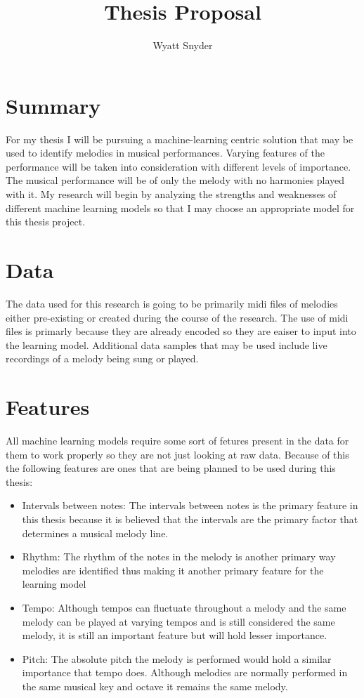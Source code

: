 \documentclass{article}
\title{Thesis Proposal}
\author{Wyatt Snyder}
\begin{document}
	\maketitle
	\section{Summary}
	For my thesis I will be pursuing a machine-learning centric solution that may be used to identify melodies in musical performances. Varying features of the performance will be taken into consideration with different levels of importance. The musical performance will be of only the melody with no harmonies played with it. My research will begin by analyzing the strengths and weaknesses of different machine learning models so that I may choose an appropriate model for this thesis project. 
	
	\section{Data}
	The data used for this research is going to be primarily midi files of melodies either pre-existing or created during the course of the research. The use of midi files is primarly because they are already encoded so they are eaiser to input into the learning model. Additional data samples that may be used include live recordings of a melody being sung or played.
	
	\section{Features}
	All machine learning models require some sort of fetures present in the data for them to work properly so they are not just looking at raw data. Because of this the following features are ones that are being planned to be used during this thesis:
	\begin{itemize}
		\item Intervals between notes: The intervals between notes is the primary feature in this thesis because it is believed that the intervals are the primary factor that determines a musical melody line.
		
		\item Rhythm: The rhythm of the notes in the melody is another primary way melodies are identified thus making it another primary feature for the learning model
		
		\item Tempo: Although tempos can fluctuate throughout a melody and the same melody can be played at varying tempos and is still considered the same melody, it is still an important feature but will hold lesser importance.
		
		\item Pitch: The absolute pitch the melody is performed would hold a similar importance that tempo does. Although melodies are normally performed in the same musical key and octave it remains the same melody.
	\end{itemize} 
	
\end{document}
